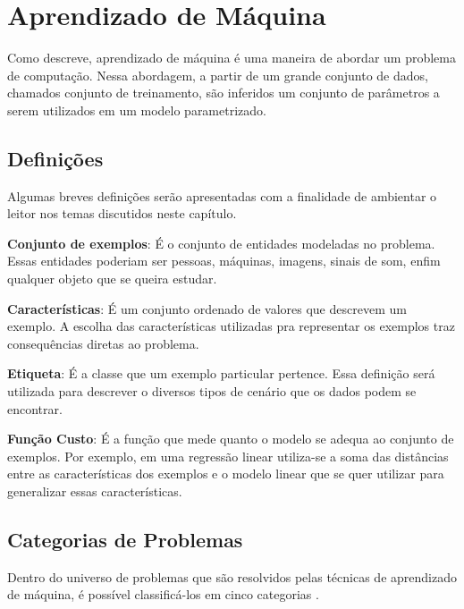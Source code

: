 \chapter{Aprendizado de Máquina}
Como \citet{bishop2006pattern} descreve, aprendizado de máquina é uma maneira de abordar um problema de computação. Nessa abordagem, a partir de um grande conjunto de dados, chamados conjunto de treinamento, são inferidos um conjunto de parâmetros a serem utilizados em um modelo parametrizado.

\section{Definições}

Algumas breves definições serão apresentadas com a finalidade de ambientar o leitor nos temas discutidos neste capítulo.

\begin{description}
\item \textbf{Conjunto de exemplos}: É o conjunto de entidades modeladas no problema. Essas entidades poderiam ser pessoas, máquinas, imagens, sinais de som, enfim qualquer objeto que se queira estudar.

\item \textbf{Características}: É um conjunto ordenado de valores que descrevem um exemplo. A escolha das características utilizadas pra representar os exemplos traz consequências diretas ao problema.

\item \textbf{Etiqueta}: É a classe que um exemplo particular pertence. Essa definição será utilizada para descrever o diversos tipos de cenário que os dados podem se encontrar.

\item \textbf{Função Custo}: É a função que mede quanto o modelo se adequa ao conjunto de exemplos. Por exemplo, em uma regressão linear utiliza-se a soma das distâncias entre as características dos exemplos e o modelo linear que se quer utilizar para generalizar essas características.
\end{description}


\section{Categorias de Problemas}

Dentro do universo de problemas que são resolvidos pelas técnicas de aprendizado de máquina, é possível classificá-los em cinco categorias \citep{mohri2012foundations}.

